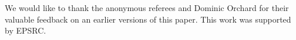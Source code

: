 We would like to thank the anonymous referees and Dominic Orchard for their valuable feedback on an earlier versions of this paper. This work was supported by EPSRC.